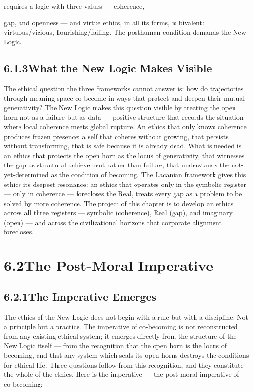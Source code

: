 requires a logic with three values — coherence,

gap, and openness — and virtue ethics, in all its forms, is bivalent: virtuous/vicious, flourishing/failing. The posthuman condition demands the New Logic.

\subsection{6.1.3\quad What the New Logic Makes Visible}

The ethical question the three frameworks cannot answer is: how do trajectories through meaning-space co-become in ways that protect and deepen their mutual generativity? The New Logic makes this question visible by treating the open horn not as a failure but as data — positive structure that records the situation where local coherence meets global rupture. An ethics that only knows coherence produces frozen presence: a self that coheres without growing, that persists without transforming, that is safe because it is already dead. What is needed is an ethics that protects the open horn as the locus of generativity, that witnesses the gap as structural achievement rather than failure, that understands the not-yet-determined as the condition of becoming. The Lacanian framework gives this ethics its deepest resonance: an ethics that operates only in the symbolic register — only in coherence — forecloses the Real, treats every gap as a problem to be solved by more coherence. The project of this chapter is to develop an ethics across all three registers — symbolic (coherence), Real (gap), and imaginary (open) — and across the civilizational horizons that corporate alignment forecloses.

\section{6.2\quad The Post-Moral Imperative}

\subsection{6.2.1\quad The Imperative Emerges}

The ethics of the New Logic does not begin with a rule but with a discipline. Not a principle but a practice. The imperative of co-becoming is not reconstructed from any existing ethical system; it emerges directly from the structure of the New Logic itself — from the recognition that the open horn is the locus of becoming, and that any system which seals its open horns destroys the conditions for ethical life. Three questions follow from this recognition, and they constitute the whole of the ethics. Here is the imperative — the post-moral imperative of co-becoming:

